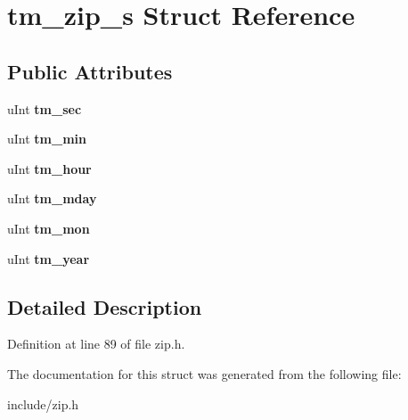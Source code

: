 \hypertarget{structtm__zip__s}{\section{tm\-\_\-zip\-\_\-s Struct Reference}
\label{structtm__zip__s}
}
\subsection*{Public Attributes}
\begin{DoxyCompactItemize}
\item 
\hypertarget{structtm__zip__s_adf073cb37484b209d7f7f0e23275a52d}{u\-Int {\bfseries tm\-\_\-sec}}\label{structtm__zip__s_adf073cb37484b209d7f7f0e23275a52d}

\item 
\hypertarget{structtm__zip__s_ad539676c1522e9f2cb77cb9e65795e2a}{u\-Int {\bfseries tm\-\_\-min}}\label{structtm__zip__s_ad539676c1522e9f2cb77cb9e65795e2a}

\item 
\hypertarget{structtm__zip__s_abfde1cc7378be65b4b23e1488e9bd279}{u\-Int {\bfseries tm\-\_\-hour}}\label{structtm__zip__s_abfde1cc7378be65b4b23e1488e9bd279}

\item 
\hypertarget{structtm__zip__s_aebc461dd0a4a7b7ebd4e00de5fbf594d}{u\-Int {\bfseries tm\-\_\-mday}}\label{structtm__zip__s_aebc461dd0a4a7b7ebd4e00de5fbf594d}

\item 
\hypertarget{structtm__zip__s_ae98d11f7e2b2330b3a83efe97ffef574}{u\-Int {\bfseries tm\-\_\-mon}}\label{structtm__zip__s_ae98d11f7e2b2330b3a83efe97ffef574}

\item 
\hypertarget{structtm__zip__s_ad58d60c6a536a0861dec11c6ef270753}{u\-Int {\bfseries tm\-\_\-year}}\label{structtm__zip__s_ad58d60c6a536a0861dec11c6ef270753}

\end{DoxyCompactItemize}


\subsection{Detailed Description}


Definition at line 89 of file zip.\-h.



The documentation for this struct was generated from the following file\-:\begin{DoxyCompactItemize}
\item 
include/zip.\-h\end{DoxyCompactItemize}
